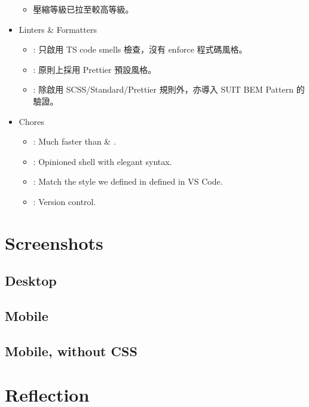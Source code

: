 \documentclass[12pt]{article}
\begin{document}
\begin{itemize}
\begin{itemize}
        \item 壓縮等級已拉至較高等級。
      \end{itemize}
    \item Linters \& Formatters
      \begin{itemize}
        \item {}: 只啟用 TS code smells 檢查，沒有 enforce 程式碼風格。
        \item {}: 原則上採用 Prettier 預設風格。
        \item {}: 除啟用 SCSS/Standard/Prettier 規則外，亦導入 SUIT BEM Pattern 的驗證。
      \end{itemize}
    \item Chores
      \begin{itemize}
        \item {}: Much faster than  \& .
        \item {}: Opinioned shell with elegant syntax.
        \item {}: Match the style we defined in  defined in VS Code.
        \item {}: Version control.
      \end{itemize}
  \end{itemize}

  \newpage

  \section{Screenshots}

  \subsection*{Desktop}

  \subsection*{Mobile}

  \subsection*{Mobile, without CSS}

  \newpage

  \section{Reflection}
\end{document}

